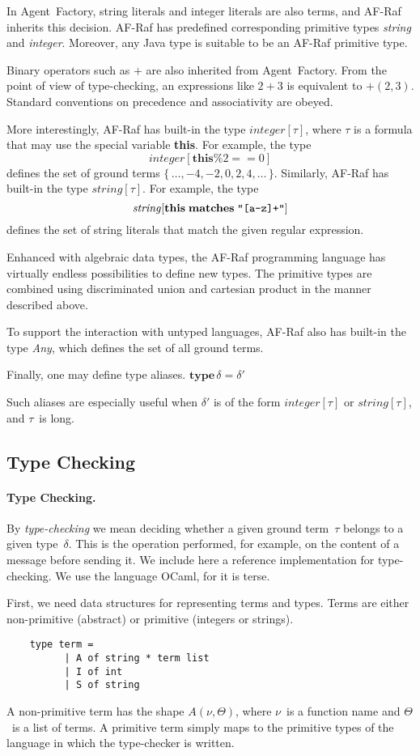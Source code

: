 \documentclass[a4paper,12pt,oneside,fleqn]{book} %
\theoremstyle{plain}
\theoremstyle{definition}
\theoremstyle{remark}
\begin{document}
In Agent~Factory, string literals and integer literals are
also terms, and AF-Raf inherits this decision. AF-Raf has
predefined corresponding primitive types \textit{string} and
\textit{integer}. Moreover, any Java type is suitable to be an AF-Raf
primitive type.

Binary operators such as $+$ are also inherited from Agent~Factory. From
the point of view of type-checking, an expressions like $2+3$ is equivalent
to $+(2,3)$. Standard conventions on precedence and associativity are
obeyed.

More interestingly, AF-Raf has built-in the type $\mathit{integer}[\tau]$,
where $\tau$ is a formula that may use the special variable \textbf{this}.
For example, the type \[\mathit{integer}[\mathbf{this}\%2==0]\] defines the
set of ground terms $\{\,\ldots,-4,-2,0,2,4,\ldots\,\}$. Similarly, AF-Raf
has built-in the type $\mathit{string}[\tau]$. For example, the type
\[\mathit{string}[\mathbf{this}\;\mathbf{matches}\;\verb|"[a-z]+"|]\]
defines the set of string literals that match the given regular expression.

Enhanced with algebraic data types, the AF-Raf programming language has
virtually endless possibilities to define new types. The primitive types
are combined using discriminated union and cartesian product in the manner
described above.

To support the interaction with untyped languages, AF-Raf also has built-in
the type \textit{Any}, which defines the set of all ground terms.

Finally, one may define type aliases.
$\mathbf{type}\,\delta=\delta'$

Such aliases are especially useful when $\delta'$ is of the form
$\mathit{integer}[\tau]$ or $\mathit{string}[\tau]$, and $\tau$~is long.
\subsection{Type Checking} %
\paragraph{Type Checking.}
By \emph{type-checking} we mean deciding whether a given ground term~$\tau$
belongs to a given type~$\delta$. This is the operation performed, for
example, on the content of a message before sending it. We include here a
reference implementation for type-checking. We use the language OCaml, for
it is terse.

First, we need data structures for representing terms and types. Terms are
either non-primitive (abstract) or primitive (integers or strings).
\begin{verbatim}
    type term =
          | A of string * term list
          | I of int
          | S of string
\end{verbatim}
A non-primitive term has the shape $A(\nu,\Theta)$, where $\nu$~is a
function name and $\Theta$~is a list of terms. A primitive term simply maps
to the primitive types of the language in which the type-checker is
written.
\end{document}
